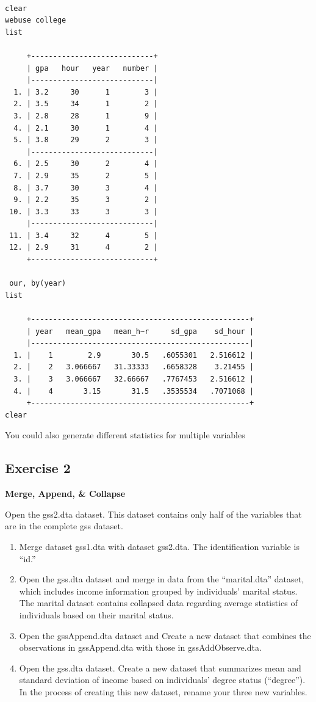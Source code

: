 \documentclass[
]{book}
\providecommand{\tightlist}{%
  \setlength{\itemsep}{0pt}\setlength{\parskip}{0pt}}
\begin{document}
\begin{verbatim}

clear
webuse college
list

     +----------------------------+
     | gpa   hour   year   number |
     |----------------------------|
  1. | 3.2     30      1        3 |
  2. | 3.5     34      1        2 |
  3. | 2.8     28      1        9 |
  4. | 2.1     30      1        4 |
  5. | 3.8     29      2        3 |
     |----------------------------|
  6. | 2.5     30      2        4 |
  7. | 2.9     35      2        5 |
  8. | 3.7     30      3        4 |
  9. | 2.2     35      3        2 |
 10. | 3.3     33      3        3 |
     |----------------------------|
 11. | 3.4     32      4        5 |
 12. | 2.9     31      4        2 |
     +----------------------------+

 our, by(year)
list

     +--------------------------------------------------+
     | year   mean_gpa   mean_h~r     sd_gpa    sd_hour |
     |--------------------------------------------------|
  1. |    1        2.9       30.5   .6055301   2.516612 |
  2. |    2   3.066667   31.33333   .6658328    3.21455 |
  3. |    3   3.066667   32.66667   .7767453   2.516612 |
  4. |    4       3.15       31.5   .3535534   .7071068 |
     +--------------------------------------------------+
clear
\end{verbatim}

You could also generate different statistics for multiple variables

\hypertarget{exercise-2-5}{%
\subsection{Exercise 2}\label{exercise-2-5}}

\textbf{Merge, Append, \& Collapse}

Open the gss2.dta dataset. This dataset contains only half of the variables that are in the complete gss dataset.

\begin{enumerate}
\def\labelenumi{\arabic{enumi}.}
\tightlist
\item
  Merge dataset gss1.dta with dataset gss2.dta. The identification variable is ``id.''
\item
  Open the gss.dta dataset and merge in data from the ``marital.dta'' dataset, which includes income information grouped by individuals' marital status. The marital dataset contains collapsed data regarding average statistics of individuals based on their marital status.
\item
  Open the gssAppend.dta dataset and Create a new dataset that combines the observations in gssAppend.dta with those in gssAddObserve.dta.
\item
  Open the gss.dta dataset. Create a new dataset that summarizes mean and standard deviation of income based on individuals' degree status (``degree''). In the process of creating this new dataset, rename your three new variables.
\end{enumerate}
\end{document}
